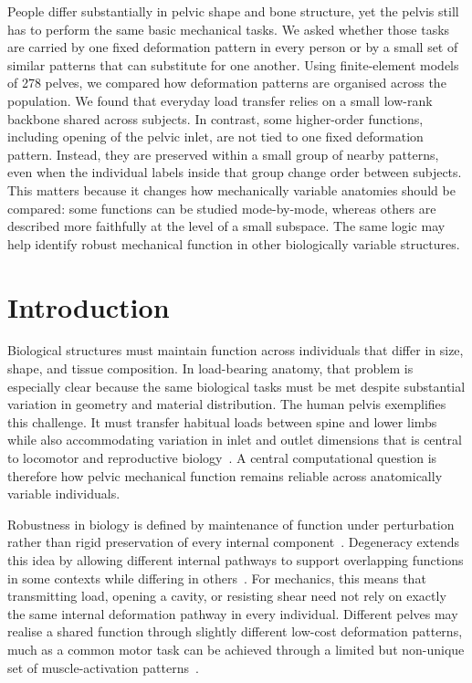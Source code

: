 \documentclass[11pt]{article}
\begin{document}
People differ substantially in pelvic shape and bone structure, yet the pelvis still has to perform the same basic mechanical tasks.
We asked whether those tasks are carried by one fixed deformation pattern in every person or by a small set of similar patterns that can substitute for one another.
Using finite-element models of 278 pelves, we compared how deformation patterns are organised across the population.
We found that everyday load transfer relies on a small low-rank backbone shared across subjects.
In contrast, some higher-order functions, including opening of the pelvic inlet, are not tied to one fixed deformation pattern.
Instead, they are preserved within a small group of nearby patterns, even when the individual labels inside that group change order between subjects.
This matters because it changes how mechanically variable anatomies should be compared: some functions can be studied mode-by-mode, whereas others are described more faithfully at the level of a small subspace.
The same logic may help identify robust mechanical function in other biologically variable structures.

\section{Introduction}
\label{sec:introduction}

Biological structures must maintain function across individuals that differ in size, shape, and tissue composition.
In load-bearing anatomy, that problem is especially clear because the same biological tasks must be met despite substantial variation in geometry and material distribution.
The human pelvis exemplifies this challenge.
It must transfer habitual loads between spine and lower limbs while also accommodating variation in inlet and outlet dimensions that is central to locomotor and reproductive biology~\citep{Washburn1960,Gruss2015,HenyssKuchar2025BoneDat,Kriechling2022}.
A central computational question is therefore how pelvic mechanical function remains reliable across anatomically variable individuals.

Robustness in biology is defined by maintenance of function under perturbation rather than rigid preservation of every internal component~\citep{Kitano2004,Kitano2007,Khammash2016}.
Degeneracy extends this idea by allowing different internal pathways to support overlapping functions in some contexts while differing in others~\citep{Whitacre2010,Whitacre2012}.
For mechanics, this means that transmitting load, opening a cavity, or resisting shear need not rely on exactly the same internal deformation pathway in every individual.
Different pelves may realise a shared function through slightly different low-cost deformation patterns, much as a common motor task can be achieved through a limited but non-unique set of muscle-activation patterns~\citep{Ting2012}.
\end{document}
